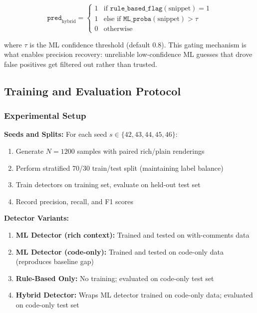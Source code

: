 \begin{equation}
\texttt{pred}_{\text{hybrid}} = \begin{cases}
1 & \text{if } \texttt{rule\_based\_flag}(\text{snippet}) = 1 \\
1 & \text{else if } \texttt{ML\_proba}(\text{snippet}) > \tau \\
0 & \text{otherwise}
\end{cases}
\end{equation}

where $\tau$ is the ML confidence threshold (default 0.8). This gating mechanism is what enables precision recovery: unreliable low-confidence ML guesses that drove false positives get filtered out rather than trusted.

\subsection{Training and Evaluation Protocol}

\subsubsection{Experimental Setup}

\textbf{Seeds and Splits:} For each seed $s \in \{42, 43, 44, 45, 46\}$:
\begin{enumerate}
  \item Generate $N = 1200$ samples with paired rich/plain renderings
  \item Perform stratified 70/30 train/test split (maintaining label balance)
  \item Train detectors on training set, evaluate on held-out test set
  \item Record precision, recall, and F1 scores
\end{enumerate}

\textbf{Detector Variants:}
\begin{enumerate}
  \item \textbf{ML Detector (rich context):} Trained and tested on with-comments data
  \item \textbf{ML Detector (code-only):} Trained and tested on code-only data (reproduces baseline gap)
  \item \textbf{Rule-Based Only:} No training; evaluated on code-only test set
  \item \textbf{Hybrid Detector:} Wraps ML detector trained on code-only data; evaluated on code-only test set
\end{enumerate}

